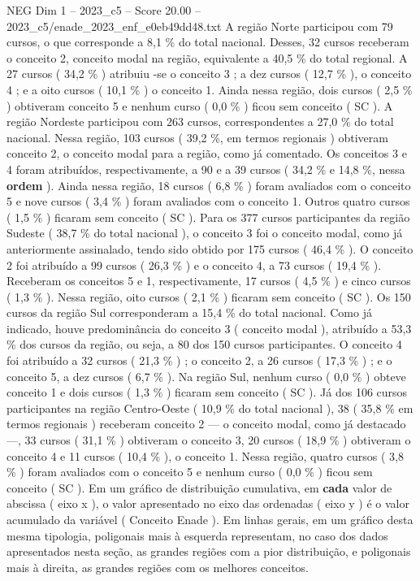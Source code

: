 \begin{textsample}{NEG Dim 1 – 2023\_c5 – Score 20.00 – 2023\_c5/enade\_2023\_enf\_e0eb49dd48.txt}
A região Norte participou com 79 cursos, o que corresponde a 8,1 \% do total nacional.
Desses, 32 cursos receberam o conceito 2, conceito modal na região, equivalente a 40,5 \% do total regional.
A 27 cursos ( 34,2 \% ) atribuiu -se o conceito 3 ; a dez cursos ( 12,7 \% ), o conceito 4 ; e a oito cursos ( 10,1 \% ) o conceito 1.
Ainda nessa região, dois cursos ( 2,5 \% ) obtiveram conceito 5 e nenhum curso ( 0,0 \% ) ficou sem conceito ( SC ).
A região Nordeste participou com 263 cursos, correspondentes a 27,0 \% do total nacional.
Nessa região, 103 cursos ( 39,2 \%, em termos regionais ) obtiveram conceito 2, o conceito modal para a região, como já comentado.
Os conceitos 3 e 4 foram atribuídos, respectivamente, a 90 e a 39 cursos ( 34,2 \% e 14,8 \%, nessa \textbf{ordem} ).
Ainda nessa região, 18 cursos ( 6,8 \% ) foram avaliados com o conceito 5 e nove cursos ( 3,4 \% ) foram avaliados com o conceito 1.
Outros quatro cursos ( 1,5 \% ) ficaram sem conceito ( SC ).
Para os 377 cursos participantes da região Sudeste ( 38,7 \% do total nacional ), o conceito 3 foi o conceito modal, como já anteriormente assinalado, tendo sido obtido por 175 cursos ( 46,4 \% ).
O conceito 2 foi atribuído a 99 cursos ( 26,3 \% ) e o conceito 4, a 73 cursos ( 19,4 \% ).
Receberam os conceitos 5 e 1, respectivamente, 17 cursos ( 4,5 \% ) e cinco cursos ( 1,3 \% ).
Nessa região, oito cursos ( 2,1 \% ) ficaram sem conceito ( SC ).
Os 150 cursos da região Sul corresponderam a 15,4 \% do total nacional.
Como já indicado, houve predominância do conceito 3 ( conceito modal ), atribuído a 53,3 \% dos cursos da região, ou seja, a 80 dos 150 cursos participantes.
O conceito 4 foi atribuído a 32 cursos ( 21,3 \% ) ; o conceito 2, a 26 cursos ( 17,3 \% ) ; e o conceito 5, a dez cursos ( 6,7 \% ).
Na região Sul, nenhum curso ( 0,0 \% ) obteve conceito 1 e dois cursos ( 1,3 \% ) ficaram sem conceito ( SC ).
Já dos 106 cursos participantes na região Centro-Oeste ( 10,9 \% do total nacional ), 38 ( 35,8 \% em termos regionais ) receberam conceito 2 — o conceito modal, como já destacado —, 33 cursos ( 31,1 \% ) obtiveram o conceito 3, 20 cursos ( 18,9 \% ) obtiveram o conceito 4 e 11 cursos ( 10,4 \% ), o conceito 1.
Nessa região, quatro cursos ( 3,8 \% ) foram avaliados com o conceito 5 e nenhum curso ( 0,0 \% ) ficou sem conceito ( SC ).
Em um gráfico de distribuição cumulativa, em \textbf{cada} valor de abscissa ( eixo x ), o valor apresentado no eixo das ordenadas ( eixo y ) é o valor acumulado da variável ( Conceito Enade ).
Em linhas gerais, em um gráfico desta mesma tipologia, poligonais mais à esquerda representam, no caso dos dados apresentados nesta seção, as grandes regiões com a pior distribuição, e poligonais mais à direita, as grandes regiões com os melhores conceitos.

\end{textsample}
